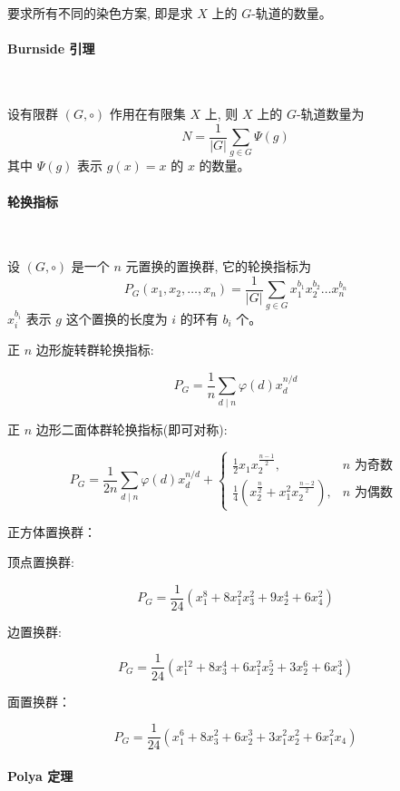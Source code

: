 要求所有不同的染色方案, 即是求 $X$ 上的 $G$-轨道的数量。\\

\paragraph{Burnside 引理}\

设有限群 $(G, \circ)$ 作用在有限集 $X$ 上, 则 $X$ 上的 $G$-轨道数量为
$$
N=\frac{1}{|G|} \sum_{g \in G} \Psi(g)
$$
其中 $\Psi(g)$ 表示 $g(x)=x$ 的 $x$ 的数量。\\

\paragraph{轮换指标}\

设 $(G, \circ)$ 是一个 $n$ 元置换的置换群, 它的轮换指标为
$$
P_{G}\left(x_{1}, x_{2}, \ldots, x_{n}\right)=\frac{1}{|G|} \sum_{g \in G} x_{1}^{b_{1}} x_{2}^{b_{2}} \ldots x_{n}^{b_{n}}
$$
$x_i^{b_i}$ 表示 $g$ 这个置换的长度为 $i$ 的环有 $b_i$ 个。

正 $n$ 边形旋转群轮换指标:

$$
P_G=\frac{1}{n}\sum_{d\mid n}\varphi(d)x_d^{n/d}
$$

正 $n$ 边形二面体群轮换指标(即可对称):

$$
P_{G}=\frac{1}{2 n} \sum_{d \mid n} \varphi(d) x_{d}^{n / d}+\left\{\begin{array}{ll}
\frac{1}{2} x_{1} x_{2}^{\frac{n-1}{2}}, \quad &n \text { 为奇数 } \\
\frac{1}{4}\left(x_{2}^{\frac{n}{2}}+x_{1}^{2} x_{2}^{\frac{n-2}{2}}\right), &n \text { 为偶数 }
\end{array}\right.
$$

正方体置换群：

顶点置换群:

$$
P_{G}=\frac{1}{24}\left(x_{1}^{8}+8 x_{1}^{2} x_{3}^{2}+9 x_{2}^{4}+6 x_{4}^{2}\right)
$$

边置换群:

$$
P_{G}=\frac{1}{24}\left(x_{1}^{12}+8 x_{3}^{4}+6 x_{1}^{2} x_{2}^{5}+3 x_{2}^{6}+6 x_{4}^{3}\right)
$$

面置换群：

$$
P_{G}=\frac{1}{24}\left(x_{1}^{6}+8 x_{3}^{2}+6 x_{2}^{3}+3 x_{1}^{2} x_{2}^{2}+6 x_{1}^{2} x_{4}\right)
$$



\paragraph{Polya 定理}\

